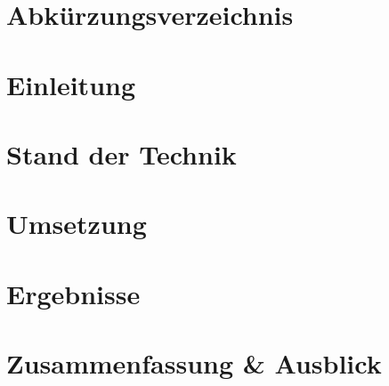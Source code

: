 \documentclass[a4paper,12pt, twoside]{scrreprt}
\begin{document}
\cleardoublepage   %
\tableofcontents

\clearpage
{}
{}%
\chapter*{Abkürzungsverzeichnis}


\chapter{Einleitung}


\chapter{Stand der Technik} %


\chapter{Umsetzung} %


\chapter{Ergebnisse}


\chapter{Zusammenfassung \& Ausblick}


	
	
\end{document}
